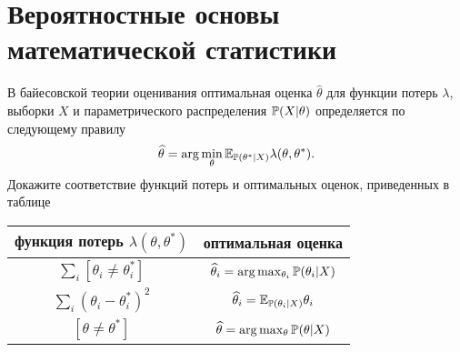 \section{Вероятностные основы математической статистики}
\label{stats}

\begin{problem}
В байесовской теории оценивания оптимальная оценка $\widehat{\theta}$ для функции потерь $\lambda$, выборки $X$ и параметрического распределения $\mathrm{{\mathbb P}}(X|\theta)$ определяется по следующему правилу
\[
\widehat{\theta} = \arg\min_{\theta} \mathrm{{\mathbb E}}_{\mathrm{{\mathbb P}}(\theta^* | X)} \lambda(\theta, \theta^*).
\] 
Докажите соответствие функций потерь и оптимальных оценок, приведенных в таблице
\begin{center}
\begin{tabular}{ c | c }

функция потерь $\lambda(\theta, \theta^*)$ & оптимальная оценка \\
\hline
$\sum_i [\theta_i \neq \theta^*_i]$ & $\widehat{\theta}_i = \arg\max_{\theta_i}\mathrm{{\mathbb P}}(\theta_i | X)$  \\ 
\hline
$\sum_i (\theta_i - \theta^*_i)^2$ & $\widehat{\theta}_i = \mathrm{{\mathbb E}}_{\mathrm{{\mathbb P}}(\theta_i | X)} \theta_i$   \\ 
\hline
$[\theta \neq \theta^*]$ & $\widehat{\theta} = \arg\max_{\theta}\mathrm{{\mathbb P}}(\theta | X)$  \\ 

\end{tabular}
\end{center}

\end{problem}

